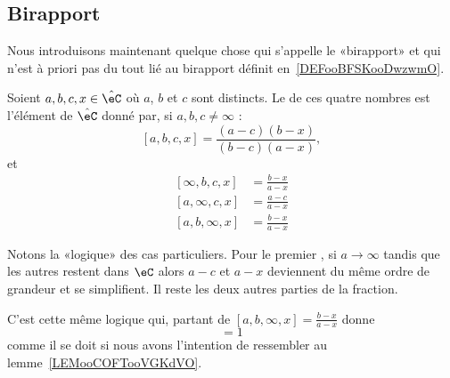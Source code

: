 \subsection{Birapport}

Nous introduisons maintenant quelque chose qui s'appelle le «birapport» et qui n'est à priori pas du tout lié au birapport définit en~\ref{DEFooBFSKooDwzwmO}.

\begin{definition}        \label{DEFooQYHVooMZwQMB}
	Soient \( a,b,c,x\in \hat\eC\) où \( a\), \( b\) et \( c\) sont distincts. Le  de ces quatre nombres est l'élément de \( \hat\eC\) donné par, si \( a,b,c\neq \infty\) :
	\begin{equation}        \label{EQooQJWZooOXKslh}
		[a,b,c,x]=\frac{ (a-c)(b-x) }{ (b-c)(a-x) },
	\end{equation}
	et
	\begin{subequations}
		\begin{align}
			[\infty,b,c,x] & =\frac{ b-x }{ a-x } \\
			[a,\infty,c,x] & =\frac{a-c}{a-x}     \\
			[a,b,\infty,x] & =\frac{ b-x }{ a-x }
		\end{align}
	\end{subequations}
\end{definition}

\begin{normaltext}
	Notons la «logique» des cas particuliers. Pour le premier%
	, si \( a\to\infty\) tandis que les autres restent dans \( \eC\) alors \( a-c\) et \( a-x\) deviennent du même ordre de grandeur et se simplifient. Il reste les deux autres parties de la fraction.

	C'est cette même logique qui, partant de \( [a,b,\infty,x]=\frac{ b-x }{ a-x }\) donne
	\begin{equation}
		[a,b,\infty,\infty]=1
	\end{equation}
	comme il se doit si nous avons l'intention de ressembler au lemme~\ref{LEMooCOFTooVGKdVO}.
\end{normaltext}

